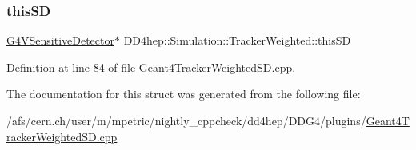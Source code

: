 \hypertarget{struct_d_d4hep_1_1_simulation_1_1_tracker_weighted_a75a27a45aa4197181191c68eb92f9863}{}\label{struct_d_d4hep_1_1_simulation_1_1_tracker_weighted_a75a27a45aa4197181191c68eb92f9863} 
\subsubsection{\texorpdfstring{this\+SD}{thisSD}}
{\footnotesize\ttfamily \hyperlink{class_g4_v_sensitive_detector}{G4\+V\+Sensitive\+Detector}$\ast$ D\+D4hep\+::\+Simulation\+::\+Tracker\+Weighted\+::this\+SD}



Definition at line 84 of file Geant4\+Tracker\+Weighted\+S\+D.\+cpp.



The documentation for this struct was generated from the following file\+:\begin{DoxyCompactItemize}
\item 
/afs/cern.\+ch/user/m/mpetric/nightly\+\_\+cppcheck/dd4hep/\+D\+D\+G4/plugins/\hyperlink{_geant4_tracker_weighted_s_d_8cpp}{Geant4\+Tracker\+Weighted\+S\+D.\+cpp}\end{DoxyCompactItemize}
